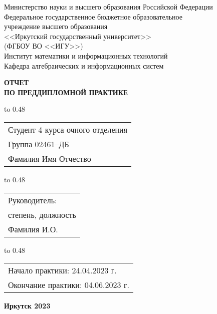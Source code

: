 \thispagestyle{empty}
\begin{center}
Министерство науки и высшего образования Российской Федерации\\
Федеральное государственное бюджетное образовательное\\
учреждение высшего образования\\
<<Иркутский государственный университет>>\\
(ФГБОУ ВО <<ИГУ>>)\\
Институт математики и информационных технологий\\
Кафедра алгебраических и информационных систем\\
\end{center}

\vspace{3.7cm}

\begin{center}
{\bf 
	ОТЧЕТ\\[1mm]
	ПО ПРЕДДИПЛОМНОЙ ПРАКТИКЕ
	\\[1mm]

}  

\end{center}

\vspace{1.8cm}

{
\noindent\hbox to 0.48\textwidth {%
	\mbox{ } \hfil} %
	\begin{tabular}[t]{l}
		Студент 4 курса очного отделения\\
		Группа 02461--ДБ\\
		Фамилия Имя Отчество
	\end{tabular}		
}

\vspace{1.3cm}

{
\noindent\hbox to 0.48\textwidth {%
	\mbox{ } \hfil} %
	\begin{tabular}[t]{l}
		Руководитель:\\ степень, должность\\
		Фамилия И.О.		
	\end{tabular}		
}

\vspace{1.3cm}
{
\noindent\hbox to 0.48\textwidth {%
	\mbox{ } \hfil} %
	\begin{tabular}[t]{l}
		Начало практики: 24.04.2023 г.\\
		Окончание практики: 04.06.2023 г.		
	\end{tabular}		
}



\vfill 
\noindent
\begin{minipage}{\textwidth}
\centering	\bf Иркутск 2023
\end{minipage}
